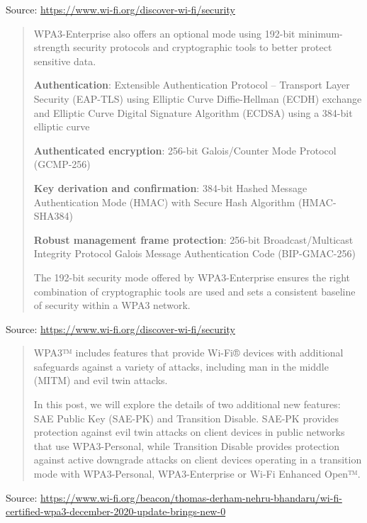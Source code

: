 \documentclass[Screen16to9,17pt]{foils}
\begin{document}
Source: \url{https://www.wi-fi.org/discover-wi-fi/security}



\begin{quote}

WPA3-Enterprise also offers an optional mode using 192-bit minimum-strength security protocols and cryptographic tools to better protect sensitive data.

\begin{list2}
\item {\bf Authentication}: Extensible Authentication Protocol – Transport Layer Security (EAP-TLS) using Elliptic Curve Diffie-Hellman (ECDH) exchange and Elliptic Curve Digital Signature Algorithm (ECDSA) using a 384-bit elliptic curve
\item {\bf Authenticated encryption}: 256-bit Galois/Counter Mode Protocol (GCMP-256)
\item {\bf Key derivation and confirmation}: 384-bit Hashed Message Authentication Mode (HMAC) with Secure Hash Algorithm (HMAC-SHA384)
\item {\bf Robust management frame protection}: 256-bit Broadcast/Multicast Integrity Protocol Galois Message Authentication Code (BIP-GMAC-256)
\end{list2}
The 192-bit security mode offered by WPA3-Enterprise ensures the right combination of cryptographic tools are used and sets a consistent baseline of security within a WPA3 network.
\end{quote}

Source: \url{https://www.wi-fi.org/discover-wi-fi/security}


\begin{quote}
WPA3™ includes features that provide Wi-Fi® devices with additional safeguards against a variety of attacks, including man in the middle (MITM) and evil twin attacks.

 In this post, we will explore the details of two additional new features: SAE Public Key (SAE-PK) and Transition Disable. SAE-PK provides protection against evil twin attacks on client devices in public networks that use WPA3-Personal, while Transition Disable provides protection against active downgrade attacks on client devices operating in a transition mode with WPA3-Personal, WPA3-Enterprise or Wi-Fi Enhanced Open™.
\end{quote}
Source: {\footnotesize
\url{https://www.wi-fi.org/beacon/thomas-derham-nehru-bhandaru/wi-fi-certified-wpa3-december-2020-update-brings-new-0}}
\end{document}

